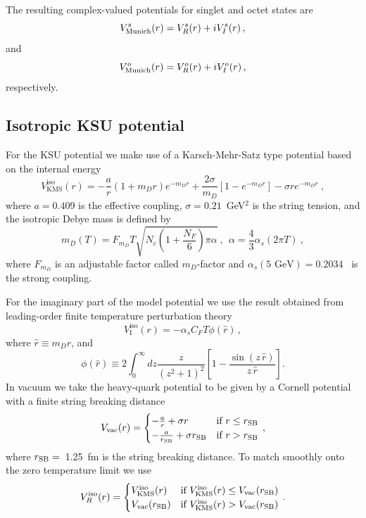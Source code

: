 \documentclass[times,sort&compress,final]{elsarticle}
\def\be{\begin{equation}}
\def\ee{\end{equation}}
\begin{document}
The resulting complex-valued potentials for singlet and octet states are 
%
\be
V^s_{\rm Munich} (r) = V^s_R (r) + i V^s_I (r) \, , 
\ee
%
and
%
\be
V^o_{\rm Munich} (r) = V^o_R (r) + i V^o_I (r) \, ,
\ee
%
respectively.

\subsection{Isotropic KSU potential}
\label{sec:isoksupotential}

For the KSU potential we make use of a Karsch-Mehr-Satz type potential based on the internal energy~\cite{Karsch:1987pv,Dumitru:2009ni,Strickland:2011aa}
%
\begin{equation}
V^{\mathrm{iso}}_{\mathrm{KMS}}(r)=-\frac{a}{r}(1+ m_D r)e^{-m_D  r}+\frac{2\sigma}{m_D }\left[1-e^{-m_D  r}\right]-\sigma r e^{-m_D  r} ~,
\end{equation}
%
where \mbox{$a = 0.409$} is the effective coupling, \mbox{$\sigma = 0.21$~GeV$^2$} is the string tension, and the isotropic Debye mass is defined by 
%
\begin{equation}
m_D(T)=F_{m_D}T\sqrt{N_c\left(1+\frac{N_F}{6}\right)\pi\alpha}~,~~\alpha = \frac{4}{3}\alpha_s (2\pi T)~,
\end{equation}
%
where $F_{m_D}$ is an adjustable factor called $m_D$-factor and $\alpha_s(5\text{ GeV}) = 0.2034$~\cite{McNeile:2010ji} is the strong coupling.

For the imaginary part of the model potential we use the result obtained from leading-order finite temperature perturbation theory~\cite{Laine:2006ns}
%
\begin{equation} 
V^{\mathrm{iso}}_{\mathrm{I}}(r) = - \alpha_s C_F T \phi(\hat{r}) \, ,
\end{equation}
%
where $\hat{r} \equiv m_D r$, and
%
\begin{equation}
 \phi(\hat{r}) \equiv 2\int_0^{\infty}dz \frac{
z}{(z^2+1)^2} \left[1-\frac{\sin(z\, \hat{r})}{z\, \hat{r}}\right] .
\end{equation}
%
In vacuum we take the heavy-quark potential to be given by a Cornell potential with a finite string breaking distance
%
\be
V_{\rm vac}(r) =
\begin{cases}  
	-\frac{a}{r} + \sigma r &\mbox{if } r \leq r_{\rm SB} \\
	-\frac{a}{r_{\rm SB} } + \sigma r_{\rm SB}   & \mbox{if } r > r_{\rm SB}
\end{cases} \, ,
\label{eq:vvac}
\ee
%
where \mbox{$r_{\rm SB}  =$ 1.25 fm} is the string breaking distance.
To match smoothly onto the zero temperature limit we use
%
\begin{equation}
V^{\rm iso}_R (r)=
\begin{cases}  V^{\rm iso}_{\rm KMS}(r)  &\mbox{if } V^{\rm iso}_{\rm KMS}(r)  \leq V_{\rm vac}(r_{\rm SB}) \\
V_{\rm vac}(r_{\rm SB}) & \mbox{if } V^{\rm iso}_{\rm KMS}(r) > V_{\rm vac}(r_{\rm SB})
\end{cases} \, .
\end{equation}
%
\end{document}
